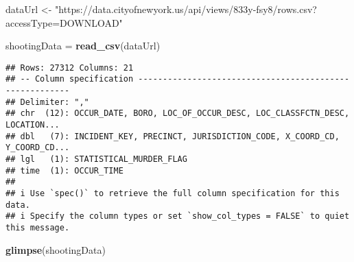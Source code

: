 \documentclass[
]{article}
\newenvironment{Shaded}{\begin{snugshade}}{\end{snugshade}}
\newcommand{\FunctionTok}[1]{\textcolor[rgb]{0.13,0.29,0.53}{\textbf{#1}}}
\newcommand{\NormalTok}[1]{#1}
\newcommand{\OtherTok}[1]{\textcolor[rgb]{0.56,0.35,0.01}{#1}}
\newcommand{\StringTok}[1]{\textcolor[rgb]{0.31,0.60,0.02}{#1}}
\begin{document}
\begin{Shaded}
\begin{Highlighting}[]
\NormalTok{dataUrl }\OtherTok{\textless{}{-}} \StringTok{"https://data.cityofnewyork.us/api/views/833y{-}fsy8/rows.csv?accessType=DOWNLOAD"}

\NormalTok{shootingData }\OtherTok{=} \FunctionTok{read\_csv}\NormalTok{(dataUrl)}
\end{Highlighting}
\end{Shaded}

\begin{verbatim}
## Rows: 27312 Columns: 21
## -- Column specification --------------------------------------------------------
## Delimiter: ","
## chr  (12): OCCUR_DATE, BORO, LOC_OF_OCCUR_DESC, LOC_CLASSFCTN_DESC, LOCATION...
## dbl   (7): INCIDENT_KEY, PRECINCT, JURISDICTION_CODE, X_COORD_CD, Y_COORD_CD...
## lgl   (1): STATISTICAL_MURDER_FLAG
## time  (1): OCCUR_TIME
## 
## i Use `spec()` to retrieve the full column specification for this data.
## i Specify the column types or set `show_col_types = FALSE` to quiet this message.
\end{verbatim}

\begin{Shaded}
\begin{Highlighting}[]
\FunctionTok{glimpse}\NormalTok{(shootingData)}
\end{Highlighting}
\end{Shaded}
\end{document}
